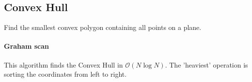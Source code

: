 \subsection{Convex Hull}
Find the smallest convex polygon containing all points on a plane.

\paragraph{Graham scan}
This algorithm finds the Convex Hull in $ \mathcal{O}{\left(N \log{N}\right)} $. The 'heaviest' operation is sorting the coordinates from left to right.
